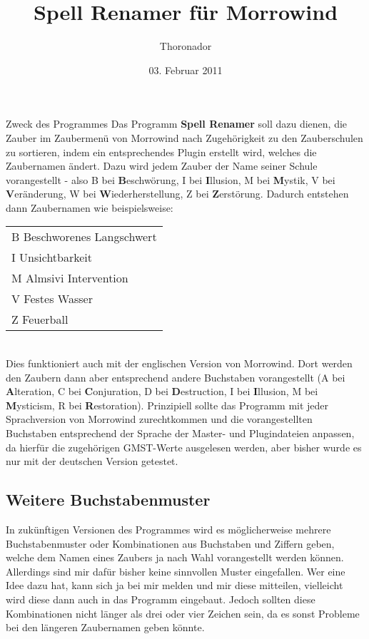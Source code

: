 \documentclass[12pt,oneside,a4paper]{article}
\title{Spell Renamer f\"{u}r Morrowind}
\author{Thoronador}
\date{03. Februar 2011}
\begin{document}
\maketitle

\begin{section}{Zweck des Programmes}
Das Programm \textbf{Spell Renamer} soll dazu dienen, die Zauber im Zaubermen\"{u}
von Morrowind nach Zugeh\"{o}rigkeit zu den Zauberschulen zu sortieren, indem
ein entsprechendes Plugin erstellt wird, welches die Zaubernamen \"{a}ndert.
Dazu wird jedem Zauber der Name seiner Schule vorangestellt - also B bei
\textbf{B}eschw\"{o}rung, I bei \textbf{I}llusion, M bei \textbf{M}ystik, V bei
\textbf{V}er\"{a}nderung, W bei \textbf{W}iederherstellung, Z bei
\textbf{Z}erst\"{o}rung.
Dadurch entstehen dann Zau\-ber\-na\-men wie beispielsweise:\\

\begin{tabular}{l}
B Beschworenes Langschwert\\
I Unsichtbarkeit\\
M Almsivi Intervention\\
V Festes Wasser\\
Z Feuerball\\
\end{tabular}
\\

Dies funktioniert auch mit der englischen Version von Morrowind. Dort werden
den Zaubern dann aber entsprechend andere Buchstaben vorangestellt (A bei
\textbf{A}lteration, C bei \textbf{C}onjuration, D bei \textbf{D}estruction,
I bei \textbf{I}llusion, M bei \textbf{M}ysticism, R bei \textbf{R}estoration).
Prinzipiell sollte das Programm mit jeder Sprachversion von Morrowind zurechtkommen
und die vorangestellten Buchstaben entsprechend der Sprache der Master- und
Plugindateien anpassen, da hierf\"{u}r die zugeh\"{o}rigen GMST-Werte ausgelesen werden,
aber bisher wurde es nur mit der deutschen Version getestet.

\subsection{Weitere Buchstabenmuster}
In zuk\"{u}nftigen Versionen des Programmes wird es m\"{o}glicherweise mehrere
Buchstabenmuster oder Kombinationen aus Buchstaben und Ziffern geben, welche
dem Namen eines Zaubers ja nach Wahl vorangestellt werden k\"{o}nnen. Allerdings
sind mir daf\"{u}r bisher keine sinnvollen Muster eingefallen. Wer eine Idee dazu
hat, kann sich ja bei mir melden und mir diese mitteilen, vielleicht wird diese
dann auch in das Programm eingebaut. Jedoch sollten diese Kombinationen nicht
l\"{a}nger als drei oder vier Zeichen sein, da es sonst Probleme bei den l\"{a}ngeren
Zaubernamen geben k\"{o}nnte.


\end{section}
\end{document}
